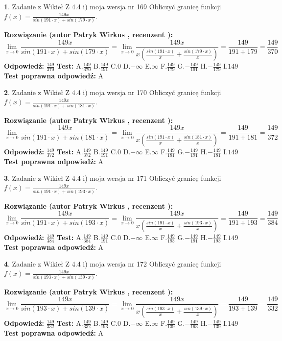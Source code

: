 \documentclass[12pt, a4paper]{article}
\theoremstyle{definition} %
\newtheorem{zad}{}
\newcommand{\zadStart}[1]{\begin{zad}#1\newline}
\newcommand{\zadStop}{\end{zad}}
\newcommand{\rozwStart}[2]{\noindent \textbf{Rozwiązanie (autor #1 , recenzent #2): }\newline}
\newcommand{\rozwStop}{\newline}
\newcommand{\odpStart}{\noindent \textbf{Odpowiedź:}\newline}
\newcommand{\odpStop}{\newline}
\newcommand{\testStart}{\noindent \textbf{Test:}\newline}
\newcommand{\testStop}{\newline}
\newcommand{\kluczStart}{\noindent \textbf{Test poprawna odpowiedź:}\newline}
\newcommand{\kluczStop}{\newline}
\begin{document}
\zadStart{Zadanie z Wikieł Z 4.4 i) moja wersja nr 169}
Obliczyć granicę funkcji $f(x)=\frac{149x}{sin(191\cdot x) +sin(179\cdot x)}$.
\zadStop
\rozwStart{Patryk Wirkus}{}
$$\lim\limits_{x\to 0}\frac{149x}{sin(191\cdot x) +sin(179\cdot x)}=\lim\limits_{x\to 0}\frac{149x}{x(\frac{sin(191\cdot x)}{x}+\frac{sin(179\cdot x)}{x})}=\frac{149}{191+179} = \frac{149}{370}$$
\rozwStop
\odpStart
$\frac{149}{370}$
\odpStop
\testStart
A.$\frac{149}{370}$
B.$\frac{149}{191}$
C.$0$
D.$-\infty$
E.$\infty$
F.$\frac{149}{179}$
G.$-\frac{149}{191}$
H.$-\frac{149}{179}$
I.$149$
\testStop
\kluczStart
A
\kluczStop



\zadStart{Zadanie z Wikieł Z 4.4 i) moja wersja nr 170}
Obliczyć granicę funkcji $f(x)=\frac{149x}{sin(191\cdot x) +sin(181\cdot x)}$.
\zadStop
\rozwStart{Patryk Wirkus}{}
$$\lim\limits_{x\to 0}\frac{149x}{sin(191\cdot x) +sin(181\cdot x)}=\lim\limits_{x\to 0}\frac{149x}{x(\frac{sin(191\cdot x)}{x}+\frac{sin(181\cdot x)}{x})}=\frac{149}{191+181} = \frac{149}{372}$$
\rozwStop
\odpStart
$\frac{149}{372}$
\odpStop
\testStart
A.$\frac{149}{372}$
B.$\frac{149}{191}$
C.$0$
D.$-\infty$
E.$\infty$
F.$\frac{149}{181}$
G.$-\frac{149}{191}$
H.$-\frac{149}{181}$
I.$149$
\testStop
\kluczStart
A
\kluczStop



\zadStart{Zadanie z Wikieł Z 4.4 i) moja wersja nr 171}
Obliczyć granicę funkcji $f(x)=\frac{149x}{sin(191\cdot x) +sin(193\cdot x)}$.
\zadStop
\rozwStart{Patryk Wirkus}{}
$$\lim\limits_{x\to 0}\frac{149x}{sin(191\cdot x) +sin(193\cdot x)}=\lim\limits_{x\to 0}\frac{149x}{x(\frac{sin(191\cdot x)}{x}+\frac{sin(193\cdot x)}{x})}=\frac{149}{191+193} = \frac{149}{384}$$
\rozwStop
\odpStart
$\frac{149}{384}$
\odpStop
\testStart
A.$\frac{149}{384}$
B.$\frac{149}{191}$
C.$0$
D.$-\infty$
E.$\infty$
F.$\frac{149}{193}$
G.$-\frac{149}{191}$
H.$-\frac{149}{193}$
I.$149$
\testStop
\kluczStart
A
\kluczStop



\zadStart{Zadanie z Wikieł Z 4.4 i) moja wersja nr 172}
Obliczyć granicę funkcji $f(x)=\frac{149x}{sin(193\cdot x) +sin(139\cdot x)}$.
\zadStop
\rozwStart{Patryk Wirkus}{}
$$\lim\limits_{x\to 0}\frac{149x}{sin(193\cdot x) +sin(139\cdot x)}=\lim\limits_{x\to 0}\frac{149x}{x(\frac{sin(193\cdot x)}{x}+\frac{sin(139\cdot x)}{x})}=\frac{149}{193+139} = \frac{149}{332}$$
\rozwStop
\odpStart
$\frac{149}{332}$
\odpStop
\testStart
A.$\frac{149}{332}$
B.$\frac{149}{193}$
C.$0$
D.$-\infty$
E.$\infty$
F.$\frac{149}{139}$
G.$-\frac{149}{193}$
H.$-\frac{149}{139}$
I.$149$
\testStop
\kluczStart
A
\kluczStop
\end{document}
